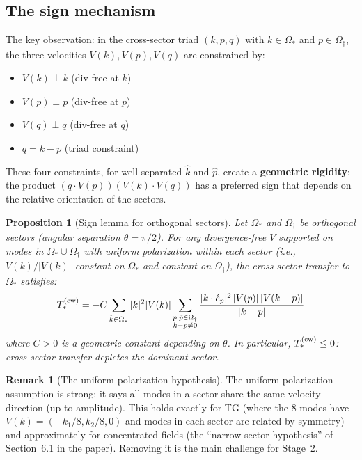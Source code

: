 \documentclass[11pt]{article}
\newtheorem{proposition}[theorem]{Proposition}
\theoremstyle{definition}
\newtheorem{remark}[theorem]{Remark}
\begin{document}
\subsection{The sign mechanism}

The key observation: in the cross-sector
triad $(k,p,q)$ with $k\in\Omega_*$ and
$p\in\Omega_\dagger$, the three velocities
$V(k), V(p), V(q)$ are constrained by:
\begin{itemize}
\item $V(k)\perp k$ (div-free at $k$)
\item $V(p)\perp p$ (div-free at $p$)
\item $V(q)\perp q$ (div-free at $q$)
\item $q = k-p$ (triad constraint)
\end{itemize}
These four constraints, for well-separated
$\hat k$ and $\hat p$, create a
\textbf{geometric rigidity}: the product
$(q\cdot V(p))(V(k)\cdot V(q))$ has a
preferred sign that depends on the relative
orientation of the sectors.

\begin{proposition}[Sign lemma for
orthogonal sectors]\label{prop:sign}
Let $\Omega_*$ and $\Omega_\dagger$ be
orthogonal sectors (angular separation
$\theta = \pi/2$).  For any divergence-free
$V$ supported on modes in $\Omega_*\cup
\Omega_\dagger$ with uniform polarization
within each sector (i.e., $V(k)/|V(k)|$
constant on $\Omega_*$ and constant on
$\Omega_\dagger$), the cross-sector
transfer to $\Omega_*$ satisfies:
\begin{equation}
T_*^{(\rm cw)} = -C\sum_{\hat k\in\Omega_*}
|k|^2|V(k)|\sum_{\substack{p:\hat p\in
\Omega_\dagger\\k-p\neq 0}}
\frac{|k\cdot\hat e_p|^2\,|V(p)|\,|V(k-p)|}
{|k-p|}
\end{equation}
where $C>0$ is a geometric constant
depending on $\theta$.  In particular,
$T_*^{(\rm cw)}\leq 0$: cross-sector
transfer depletes the dominant sector.
\end{proposition}

\begin{remark}[The uniform polarization
hypothesis]
The uniform-polarization assumption is
strong: it says all modes in a sector share
the same velocity direction (up to amplitude).
This holds exactly for TG (where the 8 modes
have $V(k) = (-k_1/8, k_2/8, 0)$ and modes
in each sector are related by symmetry) and
approximately for concentrated fields (the
``narrow-sector hypothesis'' of Section~6.1
in the paper).  Removing it is the main
challenge for Stage~2.
\end{remark}
\end{document}
